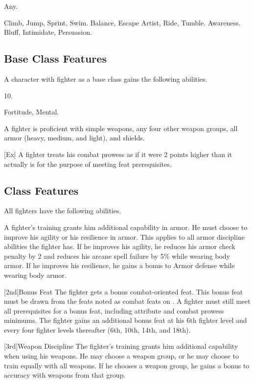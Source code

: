  Any.

 Climb, Jump, Sprint, Swim.
 Balance, Escape Artist, Ride, Tumble.
 Awareness.
 Bluff, Intimidate, Persuasion.

\subsection{Base Class Features}
A character with fighter as a base class gains the following abilities.

 10.

  Fortitude,  Mental.

 A fighter is proficient with simple weapons, any four other weapon groups,  all armor (heavy, medium, and light), and shields.

[Ex]
A fighter treats his combat prowess as if it were 2 points higher than it actually is for the purpose of meeting feat prerequisites.

\subsection{Class Features}
All fighters have the following abilities.

A fighter's training grants him additional capability in armor.
He must choose to improve his agility or his resilience in armor.
This applies to all armor discipline abilities the fighter has.
If he improves his agility, he reduces his armor check penalty by 2 and reduces his arcane spell failure by 5\% while wearing body armor.
If he improves his resilience, he gains a  bonus to Armor defense while wearing body armor.

[2nd]{Bonus Feat}
The fighter gets a bonus combat-oriented feat.
This bonus feat must be drawn from the feats noted as combat feats on .
A fighter must still meet all prerequisites for a bonus feat, including attribute and combat prowess minimums.
The fighter gains an additional bonus feat at his 6th fighter level and every four fighter levels thereafter (6th, 10th, 14th, and 18th).

[3rd]{Weapon Discipline}
The fighter's training grants him additional capability when using his weapons.
He may choose a weapon group, or he may choose to train equally with all weapons.
If he chooses a weapon group, he gains a  bonus to accuracy with weapons from that group.

